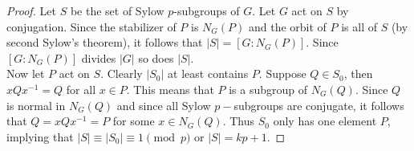 \begin{proof}
  Let $S$ be the set of Sylow $p$-subgroups of $G$. Let $G$ act on $S$ by conjugation. Since the stabilizer of $P$ is $N_G(P)$ and the orbit of $P$ is all of $S$ (by second Sylow's theorem), it follows that $|S| = [G:N_G(P)]$. Since $[G:N_G(P)]$ divides $|G|$ so does $|S|$.\\ 

  Now let $P$ act on $S$. Clearly $|S_0|$ at least contains $P$. Suppose $Q\in S_0$, then $xQx^{-1} = Q$ for all $x\in P$. This means that $P$ is a subgroup of $N_G(Q)$. Since $Q$ is normal in $N_G(Q)$ and since all Sylow $p-$subgroups are conjugate, it follows that $Q = xQx^{-1} = P$ for some $x\in N_G(Q)$. Thus $S_0$ only has one element $P$, implying that $|S| \equiv |S_0| \equiv 1 \pmod{p}$ or $|S| = kp +1$.
\end{proof}
